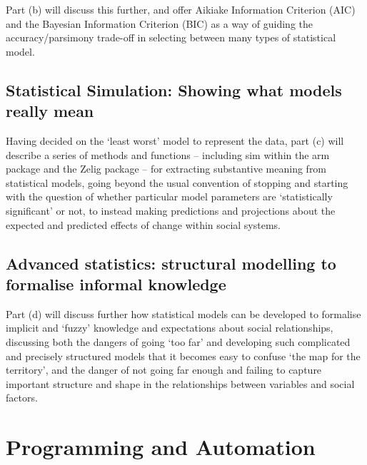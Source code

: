 \documentclass[]{book}
\theoremstyle{definition}
\theoremstyle{definition}
\theoremstyle{definition}
\theoremstyle{remark}
\begin{document}
Part (b) will discuss this further, and offer Aikiake Information
Criterion (AIC) and the Bayesian Information Criterion (BIC) as a way of
guiding the accuracy/parsimony trade-off in selecting between many types
of statistical model.

\section{Statistical Simulation: Showing what models really
mean}\label{statistical-simulation-showing-what-models-really-mean}

Having decided on the `least worst' model to represent the data, part
(c) will describe a series of methods and functions -- including sim
within the arm package and the Zelig package -- for extracting
substantive meaning from statistical models, going beyond the usual
convention of stopping and starting with the question of whether
particular model parameters are `statistically significant' or not, to
instead making predictions and projections about the expected and
predicted effects of change within social systems.

\section{Advanced statistics: structural modelling to formalise informal
knowledge}\label{advanced-statistics-structural-modelling-to-formalise-informal-knowledge}

Part (d) will discuss further how statistical models can be developed to
formalise implicit and `fuzzy' knowledge and expectations about social
relationships, discussing both the dangers of going `too far' and
developing such complicated and precisely structured models that it
becomes easy to confuse `the map for the territory', and the danger of
not going far enough and failing to capture important structure and
shape in the relationships between variables and social factors.

\chapter{Programming and Automation}\label{Coding}
\end{document}
